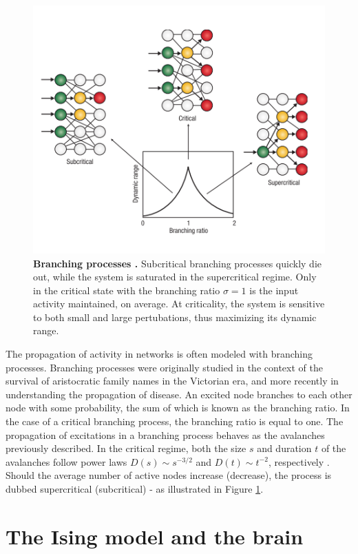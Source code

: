 \documentclass[12pt]{article}
\begin{document}
\begin{figure}[h] 
  \begin{center}    
 \includegraphics[width=.7\textwidth]{Branchingprocesschialvo}    
    \caption{\textbf{Branching processes \cite{Chialvo2006a}.} Subcritical branching processes quickly die out, while the system is saturated in the supercritical regime. Only in the critical state with the branching ratio $\sigma = 1$ is the input activity maintained, on average. At criticality, the system is sensitive to both small and large pertubations, thus maximizing its dynamic range.}
   \label{Figure::Critical Branching Process}   
  \end{center}     
   \end{figure}
   
The propagation of activity in networks is often modeled with branching processes. Branching processes were originally studied in the context of the survival of aristocratic family names in the Victorian era\cite{Watson2014}, and more recently in understanding the propagation of disease. An excited node branches to each other node with some probability, the sum of which is known as the branching ratio. In the case of a critical branching process, the branching ratio is equal to one. The propagation of excitations in a branching process behaves as the avalanches previously described. In the critical regime, both the size $s$ and duration $t$ of the avalanches follow power laws $ D(s) \sim s^{-3/2} $ and $ D(t) \sim t^{-2} $, respectively \cite{Larremore2014}. Should the average number of active nodes increase (decrease), the process is dubbed supercritical (subcritical) - as illustrated in Figure \ref{Figure::Critical Branching Process}. 
   
\section*{The Ising model and the brain}
\end{document}
